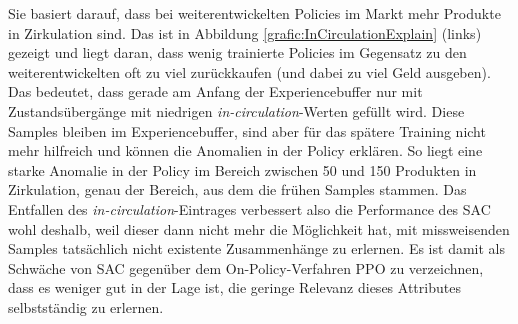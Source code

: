 Sie basiert darauf, dass bei weiterentwickelten Policies im Markt mehr Produkte in Zirkulation sind.
Das ist in Abbildung \ref{grafic:InCirculationExplain} (links) gezeigt und liegt daran, dass wenig trainierte Policies im Gegensatz zu den weiterentwickelten oft zu viel zurückkaufen (und dabei zu viel Geld ausgeben).
Das bedeutet, dass gerade am Anfang der Experiencebuffer nur mit Zustandsübergänge mit niedrigen \textit{in-circulation}-Werten gefüllt wird.
Diese Samples bleiben im Experiencebuffer, sind aber für das spätere Training nicht mehr hilfreich und können die Anomalien in der Policy erklären.
So liegt eine starke Anomalie in der Policy im Bereich zwischen 50 und 150 Produkten in Zirkulation, genau der Bereich, aus dem die frühen Samples stammen.
Das Entfallen des \textit{in-circulation}-Eintrages verbessert also die Performance des SAC wohl deshalb, weil dieser dann nicht mehr die Möglichkeit hat, mit missweisenden Samples tatsächlich nicht existente Zusammenhänge zu erlernen.
Es ist damit als Schwäche von SAC gegenüber dem On-Policy-Verfahren PPO zu verzeichnen, dass es weniger gut in der Lage ist, die geringe Relevanz dieses Attributes selbstständig zu erlernen.